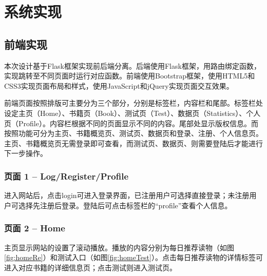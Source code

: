\documentclass[twoside,11pt]{article}
\begin{document}
\section{系统实现}
\subsection{前端实现}

本次设计基于Flask框架实现前后端分离。后端使用Flask框架，用路由绑定函数，实现跳转至不同页面时运行对应函数。前端使用Bootstrap框架，使用HTML5和CSS3实现页面布局和样式，使用JavaScript和jQuery实现页面交互效果。

前端页面按照排版可主要分为三个部分，分别是标签栏，内容栏和尾部。标签栏处设定主页（Home）、书籍页（Book）、测试页（Test）、数据页（Statistics）、个人页（Profile）。内容栏根据不同的页面显示不同的内容。尾部处显示版权信息。而按照功能可分为主页、书籍概览页、测试页、数据页和登录、注册、个人信息页。主页、书籍概览页无需登录即可查看，而测试页、数据页、则需要登陆后才能进行下一步操作。

\subsubsection{页面 1 -- Log/Register/Profile}

进入网站后，点击login可进入登录界面，已注册用户可选择直接登录；未注册用户可选择先注册后登录。登陆后可点击标签栏的“profile”查看个人信息。

\subsubsection{页面 2 -- Home}

主页显示网站的设置了滚动播放。播放的内容分别为每日推荐读物（如图\ref{fig:homeRe}）和测试入口（如图\ref{fig:homeTest}）。点击每日推荐读物的详情标签可进入对应书籍的详细信息页；点击测试则进入测试页。
\end{document}
